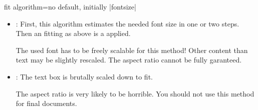 \begin{docTcbKey}{fit algorithm}{=}{no default, initially |fontsize|}
\begin{itemize}
    First, this algorithm estimates the needed font size in one or two steps.
    Then an  fitting as above is a applied.
    \begin{marker}
    The used font has to be freely scalable for this method!
    Other content than text may be slightly rescaled.
    The aspect ratio cannot be fully garanteed.
    \end{marker}
  \item{}:
    First, this algorithm estimates the needed font size in one or two steps.
    Then an  fitting as above is a applied.
    \begin{marker}
    The used font has to be freely scalable for this method!
    Other content than text may be slightly rescaled.
    The aspect ratio cannot be fully garanteed.
    \end{marker}
  \item{}:
    The text box is brutally scaled down to fit.
    \begin{marker}
    The aspect ratio is very likely to be horrible.
    You should not use this method for final documents.
    \end{marker}
\end{itemize}


\end{docTcbKey}




